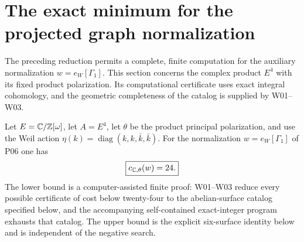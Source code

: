 \section{The exact minimum for the projected graph normalization}
\label{sec:w-exact-minimum}

The preceding reduction permits a complete, finite computation for the auxiliary normalization $w=e_W[\Gamma_1]$. This section concerns the complex product $E^4$ with its fixed product polarization. Its computational certificate uses exact integral cohomology, and the geometric completeness of the catalog is supplied by W01--W03.

\begin{theorem}[W04]
Let $E=\mathbb C/\mathbb Z[\omega]$, let $A=E^4$, let $\theta$ be the product principal polarization, and use the Weil action $\eta(k)=\operatorname{diag}(k,k,\bar k,\bar k)$. For the normalization $w=e_W[\Gamma_1]$ of P06 one has
\[
\boxed{c_{\mathbb C,\theta}(w)=24.}
\]
The lower bound is a computer-assisted finite proof: W01--W03 reduce every possible certificate of cost below twenty-four to the abelian-surface catalog specified below, and the accompanying self-contained exact-integer program exhausts that catalog. The upper bound is the explicit six-surface identity below and is independent of the negative search.
\end{theorem}

